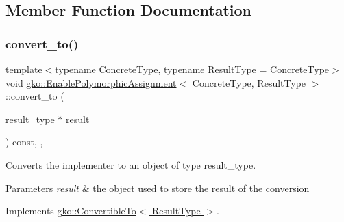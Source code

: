 \subsection{Member Function Documentation}
\mbox{\label{classgko_1_1EnablePolymorphicAssignment_a6b7e6872e96084636f8ab5091063ada8}} 
\subsubsection{\texorpdfstring{convert\+\_\+to()}{convert\_to()}}
{\footnotesize\ttfamily template$<$typename Concrete\+Type, typename Result\+Type = Concrete\+Type$>$ \\
void \hyperlink{classgko_1_1EnablePolymorphicAssignment}{gko\+::\+Enable\+Polymorphic\+Assignment}$<$ Concrete\+Type, Result\+Type $>$\+::convert\+\_\+to (\begin{DoxyParamCaption}\item[{result\+\_\+type $\ast$}]{result }\end{DoxyParamCaption}) const\hspace{0.3cm}{\ttfamily [inline]}, {\ttfamily [override]}, {\ttfamily [virtual]}}



Converts the implementer to an object of type result\+\_\+type. 


\begin{DoxyParams}{Parameters}
{\em result} & the object used to store the result of the conversion \\
\hline
\end{DoxyParams}


Implements \hyperlink{classgko_1_1ConvertibleTo_aa7f3420babcbed39ee15bc020bed4f7e}{gko\+::\+Convertible\+To$<$ Result\+Type $>$}.

\mbox{\label{classgko_1_1EnablePolymorphicAssignment_a0a4cf244139e7761d6a91c61e029810e}} 
